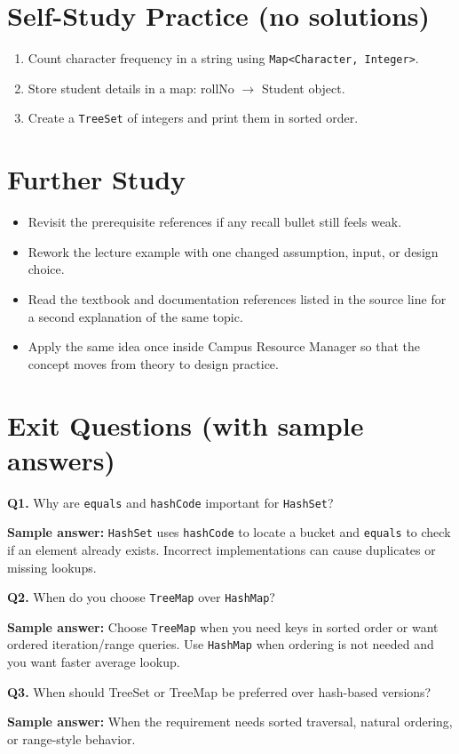 \documentclass[11pt]{article}
\begin{document}
\section{Self-Study Practice (no solutions)}
\begin{enumerate}
  \item Count character frequency in a string using \texttt{Map<Character, Integer>}.
  \item Store student details in a map: rollNo $\rightarrow$ Student object.
  \item Create a \texttt{TreeSet} of integers and print them in sorted order.
\end{enumerate}

\section{Further Study}
\begin{itemize}
  \item Revisit the prerequisite references if any recall bullet still feels weak.
  \item Rework the lecture example with one changed assumption, input, or design choice.
  \item Read the textbook and documentation references listed in the source line for a second explanation of the same topic.
  \item Apply the same idea once inside Campus Resource Manager so that the concept moves from theory to design practice.
\end{itemize}
\notesources{\OOPSUnitVSources}

\section{Exit Questions (with sample answers)}
\textbf{Q1.} Why are \texttt{equals} and \texttt{hashCode} important for \texttt{HashSet}?\par
\textbf{Sample answer:} \texttt{HashSet} uses \texttt{hashCode} to locate a bucket and \texttt{equals} to check if an element already exists. Incorrect implementations can cause duplicates or missing lookups.

\vspace{0.6em}
\textbf{Q2.} When do you choose \texttt{TreeMap} over \texttt{HashMap}?\par
\textbf{Sample answer:} Choose \texttt{TreeMap} when you need keys in sorted order or want ordered iteration/range queries. Use \texttt{HashMap} when ordering is not needed and you want faster average lookup.

\vspace{0.6em}
\textbf{Q3.} When should TreeSet or TreeMap be preferred over hash-based versions?\par
\textbf{Sample answer:} When the requirement needs sorted traversal, natural ordering, or range-style behavior.
\end{document}
